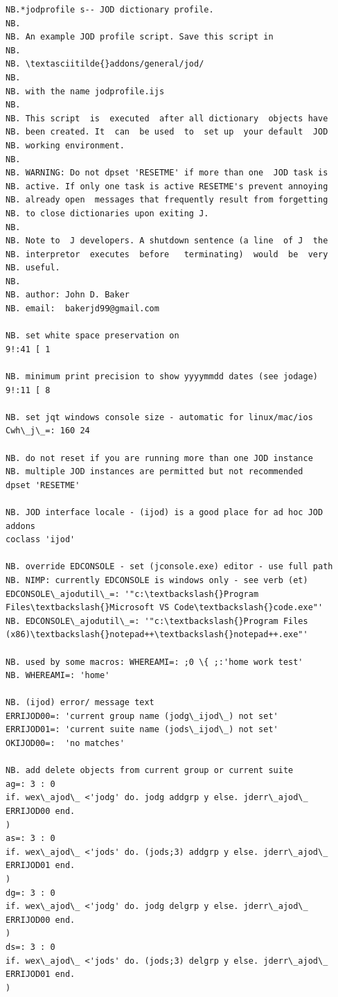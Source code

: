 \documentclass[11pt,letter,landscape]{article}
\begin{document}
    \begin{Verbatim}[commandchars=\\\{\}]
NB.*jodprofile s-- JOD dictionary profile.
NB.
NB. An example JOD profile script. Save this script in
NB.
NB. \textasciitilde{}addons/general/jod/
NB.
NB. with the name jodprofile.ijs
NB.
NB. This script  is  executed  after all dictionary  objects have
NB. been created. It  can  be used  to  set up  your default  JOD
NB. working environment.
NB.
NB. WARNING: Do not dpset 'RESETME' if more than one  JOD task is
NB. active. If only one task is active RESETME's prevent annoying
NB. already open  messages that frequently result from forgetting
NB. to close dictionaries upon exiting J.
NB.
NB. Note to  J developers. A shutdown sentence (a line  of J  the
NB. interpretor  executes  before   terminating)  would  be  very
NB. useful.
NB.
NB. author: John D. Baker
NB. email:  bakerjd99@gmail.com

NB. set white space preservation on
9!:41 [ 1

NB. minimum print precision to show yyyymmdd dates (see jodage)
9!:11 [ 8

NB. set jqt windows console size - automatic for linux/mac/ios
Cwh\_j\_=: 160 24

NB. do not reset if you are running more than one JOD instance
NB. multiple JOD instances are permitted but not recommended
dpset 'RESETME'

NB. JOD interface locale - (ijod) is a good place for ad hoc JOD addons
coclass 'ijod'

NB. override EDCONSOLE - set (jconsole.exe) editor - use full path
NB. NIMP: currently EDCONSOLE is windows only - see verb (et) 
EDCONSOLE\_ajodutil\_=: '"c:\textbackslash{}Program Files\textbackslash{}Microsoft VS Code\textbackslash{}code.exe"'
NB. EDCONSOLE\_ajodutil\_=: '"c:\textbackslash{}Program Files (x86)\textbackslash{}notepad++\textbackslash{}notepad++.exe"'

NB. used by some macros: WHEREAMI=: ;0 \{ ;:'home work test'
NB. WHEREAMI=: 'home'

NB. (ijod) error/ message text
ERRIJOD00=: 'current group name (jodg\_ijod\_) not set'
ERRIJOD01=: 'current suite name (jods\_ijod\_) not set'
OKIJOD00=:  'no matches'

NB. add delete objects from current group or current suite
ag=: 3 : 0
if. wex\_ajod\_ <'jodg' do. jodg addgrp y else. jderr\_ajod\_ ERRIJOD00 end.
)
as=: 3 : 0
if. wex\_ajod\_ <'jods' do. (jods;3) addgrp y else. jderr\_ajod\_ ERRIJOD01 end.
)
dg=: 3 : 0
if. wex\_ajod\_ <'jodg' do. jodg delgrp y else. jderr\_ajod\_ ERRIJOD00 end.
)
ds=: 3 : 0
if. wex\_ajod\_ <'jods' do. (jods;3) delgrp y else. jderr\_ajod\_ ERRIJOD01 end. 
)
   

\end{Verbatim}
\end{document}
